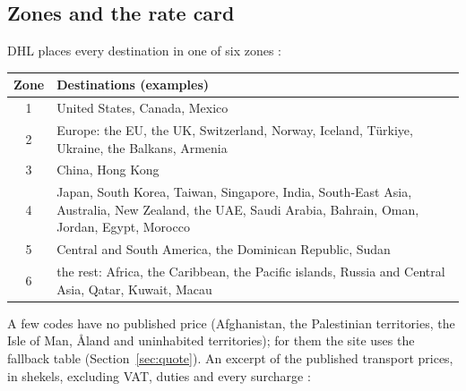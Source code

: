 \documentclass[11pt,a4paper]{article}
\begin{document}
\subsection{Zones and the rate card}
DHL places every destination in one of six zones \cite[pp.~24--25]{dhlguide}:
\begin{center}
\small
\begin{tabular}{@{}c>{\raggedright\arraybackslash}p{13.4cm}@{}}
  \toprule
  Zone & Destinations (examples) \\
  \midrule
  1 & United States, Canada, Mexico \\
  2 & Europe: the EU, the UK, Switzerland, Norway, Iceland, T\"urkiye, Ukraine, the Balkans,
    Armenia \\
  3 & China, Hong Kong \\
  4 & Japan, South Korea, Taiwan, Singapore, India, South-East Asia, Australia, New Zealand,
    the UAE, Saudi Arabia, Bahrain, Oman, Jordan, Egypt, Morocco \\
  5 & Central and South America, the Dominican Republic, Sudan \\
  6 & the rest: Africa, the Caribbean, the Pacific islands, Russia and Central Asia, Qatar,
    Kuwait, Macau \\
  \bottomrule
\end{tabular}
\end{center}
A few codes have no published price (Afghanistan, the Palestinian territories, the Isle of Man,
\AA{}land and uninhabited territories); for them the site uses the fallback table
(Section~\ref{sec:quote}). An excerpt of the published transport prices, in shekels, excluding
VAT, duties and every surcharge \cite[pp.~26--27]{dhlguide}:
\end{document}
